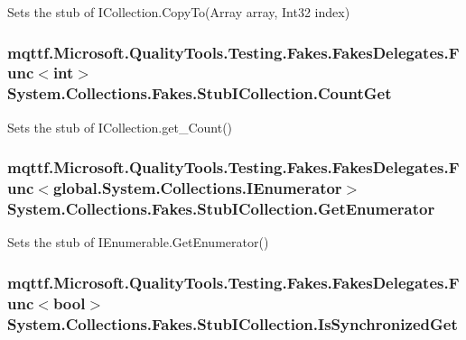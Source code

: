 Sets the stub of I\-Collection.\-Copy\-To(\-Array array, Int32 index)

\hypertarget{class_system_1_1_collections_1_1_fakes_1_1_stub_i_collection_a3c486fdda91baa220ed9321b5b88a7b8}{
\subsubsection[{Count\-Get}]{\setlength{\rightskip}{0pt plus 5cm}mqttf.\-Microsoft.\-Quality\-Tools.\-Testing.\-Fakes.\-Fakes\-Delegates.\-Func$<$int$>$ System.\-Collections.\-Fakes.\-Stub\-I\-Collection.\-Count\-Get}}\label{class_system_1_1_collections_1_1_fakes_1_1_stub_i_collection_a3c486fdda91baa220ed9321b5b88a7b8}


Sets the stub of I\-Collection.\-get\-\_\-\-Count()

\hypertarget{class_system_1_1_collections_1_1_fakes_1_1_stub_i_collection_afccd99531ebf222cc167550a2b6e0cbf}{
\subsubsection[{Get\-Enumerator}]{\setlength{\rightskip}{0pt plus 5cm}mqttf.\-Microsoft.\-Quality\-Tools.\-Testing.\-Fakes.\-Fakes\-Delegates.\-Func$<$global.\-System.\-Collections.\-I\-Enumerator$>$ System.\-Collections.\-Fakes.\-Stub\-I\-Collection.\-Get\-Enumerator}}\label{class_system_1_1_collections_1_1_fakes_1_1_stub_i_collection_afccd99531ebf222cc167550a2b6e0cbf}


Sets the stub of I\-Enumerable.\-Get\-Enumerator()

\hypertarget{class_system_1_1_collections_1_1_fakes_1_1_stub_i_collection_a7f56b563958d26edda45adf6c905a889}{
\subsubsection[{Is\-Synchronized\-Get}]{\setlength{\rightskip}{0pt plus 5cm}mqttf.\-Microsoft.\-Quality\-Tools.\-Testing.\-Fakes.\-Fakes\-Delegates.\-Func$<$bool$>$ System.\-Collections.\-Fakes.\-Stub\-I\-Collection.\-Is\-Synchronized\-Get}}\label{class_system_1_1_collections_1_1_fakes_1_1_stub_i_collection_a7f56b563958d26edda45adf6c905a889}


